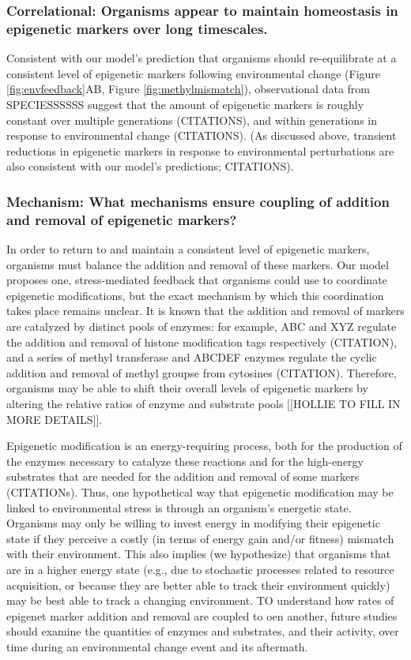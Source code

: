 \documentclass{article}
\begin{document}
\subsubsection{Correlational: Organisms appear to maintain homeostasis in epigenetic markers over long timescales.}

Consistent with our model's prediction that organisms should re-equilibrate at a consistent level of epigenetic markers following environmental change (Figure \ref{fig:envfeedback}AB, Figure \ref{fig:methylmismatch}), observational data from SPECIESSSSSS suggest that the amount of epigenetic markers is roughly constant over multiple generations (CITATIONS), and within generations in response to environmental change (CITATIONS). (As discussed above, transient reductions in epigenetic markers in response to environmental perturbations are also consistent with our model's predictions; CITATIONS).



\subsubsection{Mechanism: What mechanisms ensure coupling of addition and removal of epigenetic markers?}

In order to return to and maintain a consistent level of epigenetic markers, organisms must balance the addition and removal of these markers. Our model proposes one, stress-mediated feedback that organisms could use to coordinate epigenetic modifications, but the exact mechanism by which this coordination takes place remains unclear. It is known that the addition and removal of markers are catalyzed by distinct pools of enzymes: for example, ABC and XYZ regulate the addition and removal of histone modification tags respectively (CITATION), and a series of methyl transferase and ABCDEF enzymes regulate the cyclic addition and removal of methyl groupse from cytosines (CITATION). Therefore, organisms may be able to shift their overall levels of epigenetic markers by altering the relative ratios of enzyme and substrate pools [[HOLLIE TO FILL IN MORE DETAILS]].

Epigenetic modification is an energy-requiring process, both for the production of the enzymes necessary to catalyze these reactions and for the high-energy substrates that are needed for the addition and removal of some markers (CITATIONs). Thus, one hypothetical way that epigenetic modification may be linked to environmental stress is through an organism's energetic state. Organisms may only be willing to invest energy in modifying their epigenetic state if they perceive a costly (in terms of energy gain and/or fitness) mismatch with their environment. This also implies (we hypothesize) that organisms that are in a higher energy state (e.g., due to stochastic processes related to resource acquisition, or because they are better able to track their environment quickly) may be best able to track a changing environment. TO understand how rates of epigenet marker addition and removal are coupled to oen another, future studies should examine the quantities of enzymes and substrates, and their activity, over time during an environmental change event and its aftermath.
\end{document}
